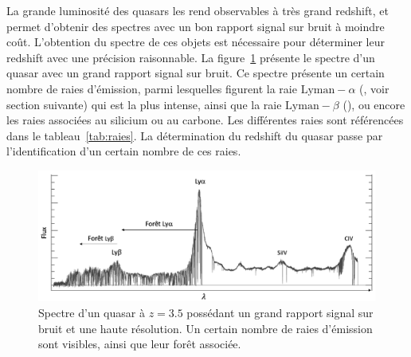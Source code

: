 La grande luminosité des quasars les rend observables à très grand redshift, et permet d'obtenir des spectres avec un bon rapport signal sur bruit à moindre coût. L'obtention du spectre de ces objets est nécessaire pour déterminer leur redshift avec une précision raisonnable. La figure~\ref{fig:spectre_qso} présente le spectre d'un quasar avec un grand rapport signal sur bruit. Ce spectre présente un certain nombre de raies d'émission, parmi lesquelles figurent la raie $\mathrm{Lyman-}\alpha$ (\lya{}, voir section suivante) qui est la plus intense, ainsi que la raie $\mathrm{Lyman-}\beta$ (\lyb{}), ou encore les raies associées au silicium ou au carbone. Les différentes raies sont référencées dans le tableau~\ref{tab:raies}. La détermination du redshift du quasar passe par l'identification d'un certain nombre de ces raies.
\begin{figure}
  \centering
  \includegraphics[scale=0.4]{spectre_qso}
  \caption{Spectre d'un quasar à $z = 3.5$ possédant un grand rapport signal sur bruit et une haute résolution. Un certain nombre de raies d'émission sont visibles, ainsi que leur forêt associée.}
  \label{fig:spectre_qso}
\end{figure}
